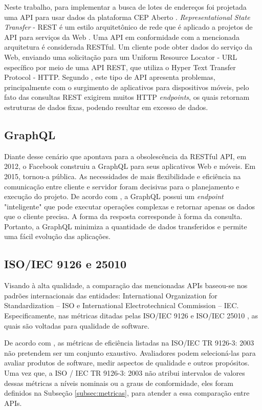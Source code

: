 \documentclass[conference]{IEEEtran}
\begin{document}
Neste trabalho, para implementar a busca de lotes de endereços foi projetada uma API para usar dados da plataforma CEP Aberto \cite{CEPAberto:2019}. \textit{Representational State Transfer} - REST é um estilo arquitetônico de rede que é aplicado a projetos de API para serviços da Web \cite{masse2011rest}. Uma API em conformidade com a mencionada arquitetura é considerada RESTful.  Um cliente pode obter dados do serviço da Web, enviando uma solicitação para um Uniform Resource Locator - URL específico por meio de uma API REST, que utiliza o Hyper Text Transfer Protocol - HTTP. Segundo \cite{ritsila2018graphql}, este tipo de API apresenta problemas, principalmente com o surgimento de aplicativos para dispositivos móveis, pelo fato das consultas REST exigirem muitos HTTP \textit{endpoints}, os quais retornam estruturas de dados fixas, podendo resultar em excesso de dados.

\subsection{GraphQL}
Diante desse cenário que apontava para a obsolescência da RESTful API, em 2012, o Facebook construiu a GraphQL para seus aplicativos Web e móveis. Em 2015, tornou-a pública. As necessidades de mais flexibilidade e eficiência na comunicação entre cliente e servidor foram decisivas para o planejamento e execução do projeto. De acordo com \cite{ritsila2018graphql}, a GraphQL possui um \textit{endpoint}  "inteligente"  que pode executar operações complexas e retornar apenas os dados que o cliente precisa. A forma da resposta corresponde à forma da consulta. Portanto, a GraphQL minimiza a quantidade de dados transferidos e permite uma fácil evolução das aplicações.

\subsection{ISO/IEC 9126 e 25010}
Visando à alta qualidade, a comparação das mencionadas APIs baseou-se nos padrões internacionais das entidades: International Organization for Standardization – ISO e International Electrotechnical Commission – IEC. Especificamente, nas métricas ditadas pelas ISO/IEC 9126 \cite{iso9126} e ISO/IEC 25010 \cite{iso25010}, as quais são voltadas para qualidade de software.

De acordo com \cite{iso9126}, as métricas de eficiência listadas na ISO/IEC TR 9126-3: 2003 não pretendem ser um conjunto exaustivo. Avaliadores podem selecioná-las para avaliar produtos de software, medir aspectos de qualidade e outros propósitos. Uma vez que, a ISO / IEC TR 9126-3: 2003 não atribui intervalos de valores dessas métricas a níveis nominais ou a graus de conformidade, eles foram definidos na Subseção \ref{subsec:metricas}, para atender a essa comparação entre APIs.
\end{document}
